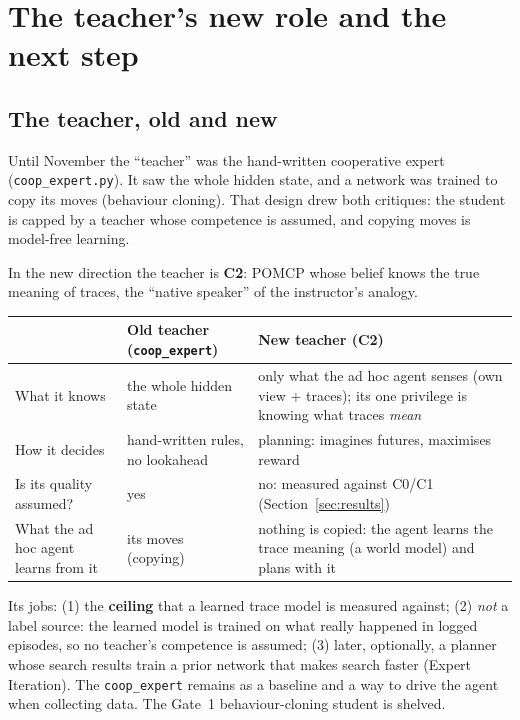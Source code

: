 \documentclass[11pt,a4paper]{article}
\newcommand{\file}{\nolinkurl}  %
\newcommand{\code}[1]{\texttt{#1}}
\theoremstyle{remark}
\begin{document}
\section{The teacher's new role and the next step}
\label{sec:next}

\subsection{The teacher, old and new}

Until November the ``teacher'' was the hand-written cooperative expert (\file{coop_expert.py}). It saw the whole hidden
state, and a network was trained to copy its moves (behaviour cloning). That design drew both critiques: the student is
capped by a teacher whose competence is assumed, and copying moves is model-free learning.

In the new direction the teacher is \textbf{C2}: POMCP whose belief knows the true meaning of traces, the ``native
speaker'' of the instructor's analogy.
\begin{center}
\small
\begin{tabular}{p{3.6cm}p{5.2cm}p{5.6cm}}
\toprule
 & Old teacher (\code{coop\_expert}) & New teacher (C2) \\
\midrule
What it knows & the whole hidden state & only what the ad hoc agent senses (own view + traces); its one privilege is knowing what
  traces \emph{mean} \\
How it decides & hand-written rules, no lookahead & planning: imagines futures, maximises reward \\
Is its quality assumed? & yes & no: measured against C0/C1 (Section~\ref{sec:results}) \\
What the ad hoc agent learns from it & its moves (copying) & nothing is copied: the agent learns the trace meaning (a
  world model) and plans with it \\
\bottomrule
\end{tabular}
\end{center}
Its jobs: (1) the \textbf{ceiling} that a learned trace model is measured against; (2) \emph{not} a label source: the
learned model is trained on what really happened in logged episodes, so no teacher's competence is assumed; (3) later,
optionally, a planner whose search results train a prior network that makes search faster (Expert Iteration). The
\code{coop\_expert} remains as a baseline and a way to drive the agent when collecting data. The Gate~1 behaviour-cloning
student is shelved.
\end{document}
